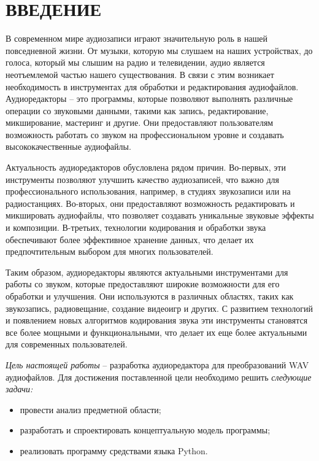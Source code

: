 \section*{ВВЕДЕНИЕ}

В современном мире аудиозаписи играют значительную роль в нашей повседневной жизни. От музыки, которую мы слушаем на наших устройствах, до голоса, который мы слышим на радио и телевидении, аудио является неотъемлемой частью нашего существования. В связи с этим возникает необходимость в инструментах для обработки и редактирования аудиофайлов. Аудиоредакторы – это программы, которые позволяют выполнять различные операции со звуковыми данными, такими как запись, редактирование, микширование, мастеринг и другие. Они предоставляют пользователям возможность работать со звуком на профессиональном уровне и создавать высококачественные аудиофайлы.

Актуальность аудиоредакторов обусловлена рядом причин. Во-первых, эти инструменты позволяют улучшить качество аудиозаписей, что важно для профессионального использования, например, в студиях звукозаписи или на радиостанциях. Во-вторых, они предоставляют возможность редактировать и микшировать аудиофайлы, что позволяет создавать уникальные звуковые эффекты и композиции. В-третьих, технологии кодирования и обработки звука обеспечивают более эффективное хранение данных, что делает их предпочтительным выбором для многих пользователей.

Таким образом, аудиоредакторы являются актуальными инструментами для работы со звуком, которые предоставляют широкие возможности для его обработки и улучшения. Они используются в различных областях, таких как звукозапись, радиовещание, создание видеоигр и других. С развитием технологий и появлением новых алгоритмов кодирования звука эти инструменты становятся все более мощными и функциональными, что делает их еще более актуальными для современных пользователей.

\emph{Цель настоящей работы} – разработка аудиоредактора для преобразований WAV аудиофайлов. Для достижения поставленной цели необходимо решить \emph{следующие задачи:}
\begin{itemize}
\item провести анализ предметной области;
\item разработать и спроектировать концептуальную модель программы;
\item реализовать программу средствами языка Python.
\end{itemize}

